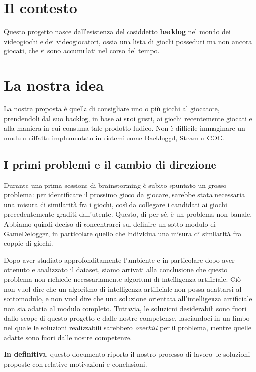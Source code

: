 \section{Il contesto}
Questo progetto nasce dall'esistenza del cosiddetto \textbf{backlog} nel mondo dei videogiochi e dei videogiocatori, ossia una lista di giochi posseduti ma non ancora giocati, che si sono accumulati nel corso del tempo.

\section{La nostra idea}
La nostra proposta è quella di consigliare uno o più giochi al giocatore, prendendoli dal suo backlog, in base ai suoi gusti, ai giochi recentemente giocati e alla maniera in cui consuma tale prodotto ludico. Non è difficile immaginare un modulo siffatto implementato in sistemi come Backloggd, Steam o GOG.
    \subsection{I primi problemi e il cambio di direzione}
        Durante una prima sessione di brainstorming è subito spuntato un grosso problema: per identificare il prossimo gioco da giocare, sarebbe stata necessaria una misura di similarità fra i giochi, così da collegare i candidati ai giochi precedentemente graditi dall'utente. Questo, di per sé, è un problema non banale. Abbiamo quindi deciso di concentrarci sul definire un sotto-modulo di GameDelogger, in particolare quello che individua una misura di similarità fra coppie di giochi.
    
        Dopo aver studiato approfonditamente l'ambiente e in particolare dopo aver ottenuto e analizzato il dataset, siamo arrivati alla conclusione che questo problema non richiede necessariamente algoritmi di intelligenza artificiale. Ciò non vuol dire che un algoritmo di intelligenza artificiale non possa adattarsi al sottomodulo, e non vuol dire che una soluzione orientata all'intelligenza artificiale non sia adatta al modulo completo. Tuttavia, le soluzioni desiderabili sono fuori dallo scope di questo progetto e dalle nostre competenze, lasciandoci in un limbo nel quale le soluzioni realizzabili sarebbero \textit{overkill} per il problema, mentre quelle adatte sono fuori dalle nostre competenze.
        
        \textbf{In definitiva}, questo documento riporta il nostro processo di lavoro, le soluzioni proposte con relative motivazioni e conclusioni.